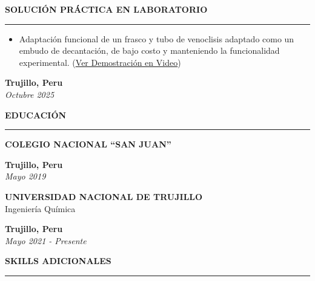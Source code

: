 \documentclass[11pt]{article}
\begin{document}
\textbf{SOLUCIÓN PRÁCTICA EN LABORATORIO}
\vspace{1.5pt}
\hrule

\begin{itemize}
  \item Adaptación funcional de un frasco y tubo de venoclisis adaptado como un embudo de decantación, de bajo costo y manteniendo la funcionalidad experimental. (\href{https://youtu.be/pFpjQrNNLns}{\uline{Ver Demostración en Video}})
\end{itemize}

\begin{flushright}
\textbf{Trujillo, Peru} \\
\textit{Octubre 2025}
\end{flushright}

\vspace{6pt}

{\large\bfseries EDUCACIÓN}
\vspace{1.5pt}
\hrule
\vspace{4pt}

\begin{minipage}[t]{0.75\textwidth}
\textbf{\fontsize{10}{12}\selectfont COLEGIO NACIONAL ``SAN JUAN''} 
\end{minipage}%
\begin{minipage}[t]{0.25\textwidth}
\raggedleft
\textbf{Trujillo, Peru} \\
\textit{Mayo 2019}
\end{minipage}

\vspace{4pt}

\begin{minipage}[t]{0.55\textwidth}
\textbf{\fontsize{10}{12}\selectfont UNIVERSIDAD NACIONAL DE TRUJILLO} \\
Ingeniería Química
\end{minipage}%
\begin{minipage}[t]{0.45\textwidth}
\raggedleft
\textbf{Trujillo, Peru} \\
\textit{Mayo 2021 - Presente}
\end{minipage}

\vspace{6pt}

{\large\bfseries SKILLS ADICIONALES}
\vspace{1.5pt}
\hrule
\vspace{4pt}
\end{document}
